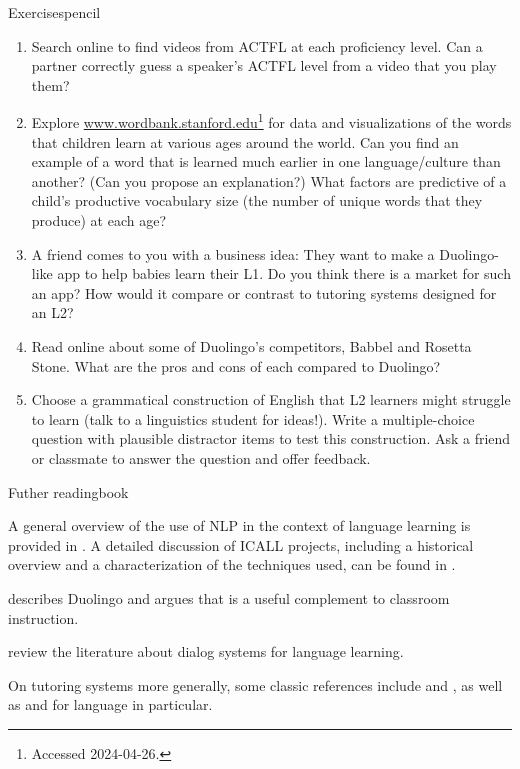 \begin{tblsfilledsymbol}{Exercises}{pencil}

\begin{enumerate}
\setcounter{enumi}{0}

\item  Search online to find videos from ACTFL at each proficiency level.  Can a partner correctly guess a speaker's ACTFL level from a video that you play them?

\item   Explore \url{www.wordbank.stanford.edu}\footnote{Accessed 2024-04-26.} for data and visualizations of the words that children learn at various ages around the world.  Can you find an example of a word that is learned much earlier in one language/culture than another? (Can you propose an explanation?)  What factors are predictive of a child's productive vocabulary size (the number of unique words that they produce) at each age?  

\item  A friend comes to you with a business idea: They want to make a Duolingo-like app to help babies learn their L1.  Do you think there is a market for such an app?  How would it compare or contrast to tutoring systems designed for an L2?


\item  Read online about some of Duolingo's competitors, Babbel and Rosetta Stone.  What are the pros and cons of each compared to Duolingo?

\item Choose a grammatical construction of English that L2 learners might struggle to learn (talk to a linguistics student for ideas!).  Write a multiple-choice question with plausible distractor items to test this construction.  Ask a friend or classmate to answer the question and offer feedback.

\end{enumerate}
\end{tblsfilledsymbol}


\begin{tblsfilledsymbol}{Futher reading}{book}


A general overview of the use of NLP in the context of language
learning is provided in \citet{Meurers-20}. A detailed discussion of
ICALL projects, including a historical overview and a characterization
of the techniques used, can be found in \citet{Heift.Schulze-07}.  

\citet{Munday:2016} describes Duolingo and argues that is a useful complement to classroom instruction.

\citet{Huang-etal:2022} review the literature about dialog systems for language learning.

On tutoring systems more generally, some classic references include \citet{Swartz.Yazdani-92} and \citet{Holland.Kaplan.Sams-2013}, as well as  \citet{Heift:2010} and \citet{Amaral.Meurers-11}  for language in particular. 

\end{tblsfilledsymbol}


